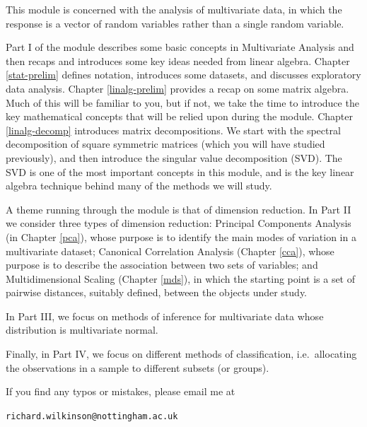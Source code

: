 \documentclass[
]{book}
\theoremstyle{definition}
\theoremstyle{definition}
\theoremstyle{definition}
\theoremstyle{definition}
\theoremstyle{remark}
\begin{document}
\newcommand{\tcov}{\text{cov}}
\newcommand{\texp}{\text{exp}}
\newcommand{\lb}{\left(}
\newcommand{\rb}{\right)}
\newcommand{\lsb}{\left[}
\newcommand{\rsb}{\right]}
\newcommand{\BE}{{\mathbb{E}}}
\newcommand{\BP}{{\mathbb{P}}}
\newcommand{\cov}{{\mathbb{C}\operatorname{ov}}}
\newcommand{\var}{{\mathbb{V}\operatorname{ar}}}
\newcommand{\cor}{{\mathbb{C}\operatorname{or}}}

This module is concerned with the analysis of multivariate data, in which the response is a vector of random variables rather than a single random variable.

Part I of the module describes some basic concepts in Multivariate Analysis and then recaps and introduces some key ideas needed from linear algebra.
Chapter \ref{stat-prelim} defines notation, introduces some datasets, and discusses exploratory data analysis. Chapter \ref{linalg-prelim} provides a recap on some matrix algebra. Much of this will be familiar to you, but if not, we take the time to introduce the key mathematical concepts that will be relied upon during the module. Chapter \ref{linalg-decomp} introduces matrix decompositions. We start with the spectral decomposition of square symmetric matrices (which you will have studied previously), and then introduce the singular value decomposition (SVD). The SVD is one of the most important concepts in this module, and is the key linear algebra technique behind many of the methods we will study.

A theme running through the module is that of dimension reduction. In Part II we consider three types of dimension reduction: Principal Components Analysis (in Chapter \ref{pca}),
whose purpose is to identify the main modes of variation in a multivariate dataset; Canonical Correlation Analysis (Chapter \ref{cca}), whose purpose is to describe the association between two sets of variables; and Multidimensional Scaling (Chapter \ref{mds}), in which the starting point is a set of pairwise distances, suitably defined, between the objects under study.

In Part III, we focus on methods of inference for multivariate data whose distribution is multivariate normal.

Finally, in Part IV, we focus on different methods of classification, i.e.~allocating the observations in a sample to different subsets (or groups).

If you find any typos or mistakes, please email me at

\texttt{richard.wilkinson@nottingham.ac.uk}
\end{document}
